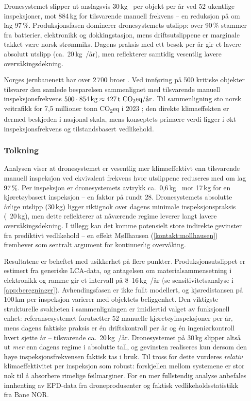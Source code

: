 Dronesystemet slipper ut anslagsvis 30\,kg~ per objekt per år ved 52 ukentlige inspeksjoner, mot 884\,kg for tilsvarende manuell frekvens -- en reduksjon på om lag 97\,\%. Produksjonsfasen dominerer dronesystemets utslipp: over 90\,\% stammer fra batterier, elektronikk og dokkingstasjon, mens driftsutslippene er marginale takket være norsk strømmiks. Dagens praksis med ett besøk per år gir et lavere absolutt utslipp (ca.\ 20\,kg~/år), men reflekterer samtidig vesentlig lavere overvåkingsdekning.

Norges jernbanenett har over 2\,700 broer \parencite{jernbanedirektoratet_tall}. Ved innføring på 500 kritiske objekter tilsvarer den samlede besparelsen sammenlignet med tilsvarende manuell inspeksjonsfrekvens $500 \cdot 854\,\text{kg} \approx 427\,\text{t~\ce{CO2eq}/år}$. Til sammenligning sto norsk veitrafikk for 7{,}5 millioner tonn CO\textsubscript{2}eq i 2023 \parencite{ssb_utslipp}; den direkte klimaeffekten er dermed beskjeden i nasjonal skala, mens konseptets primære verdi ligger i økt inspeksjonsfrekvens og tilstandsbasert vedlikehold.

\subsubsection{Tolkning}

Analysen viser at dronesystemet er vesentlig mer klimaeffektivt enn tilsvarende manuell inspeksjon ved ekvivalent frekvens hvor utslippene reduseres med om lag 97\,\%. Per inspeksjon er dronesystemets avtrykk ca.\ 0{,}6\,kg~ mot 17\,kg for en kjøretøybasert inspeksjon -- en faktor på rundt 28. Dronesystemets absolutte årlige utslipp (30\,kg) ligger riktignok over dagens minimale inspeksjonspraksis (~20\,kg), men dette reflekterer at nåværende regime leverer langt lavere overvåkingsdekning. I tillegg kan det komme potensielt store indirekte gevinster fra prediktivt vedlikehold -- en effekt Møllhausen (\cref{kontakt:mollhausen}) fremhever som sentralt argument for kontinuerlig overvåking.

Resultatene er beheftet med usikkerhet på flere punkter. Produksjonsutslippet er estimert fra generiske LCA-data, og antagelsen om materialsammensetning i elektronikk og ramme gir et intervall på 8--16\,kg~/år (se sensitivitetsanalyse i \cref{app:beregninger}). Avhendingsfasen er ikke fullt modellert, og kjøredistansen på 100\,km per inspeksjon varierer med objektets beliggenhet. Den viktigste strukturelle svakheten i sammenligningen er imidlertid valget av funksjonell enhet: referansesystemet forutsetter 52 manuelle kjøretøyinspeksjoner per år, mens dagens faktiske praksis er én driftskontroll per år og én ingeniørkontroll hvert sjette år -- tilsvarende ca.\ 20\,kg~/år. Dronesystemet på 30\,kg slipper altså ut \emph{mer} enn dagens regime i absolutte tall, og gevinsten realiseres kun dersom den høye inspeksjonsfrekvensen faktisk tas i bruk. Til tross for dette vurderes \emph{relativ} klimaeffektivitet per inspeksjon som robust: forskjellen mellom systemene er stor nok til å absorbere rimelige feilmarginer. For en mer fullstendig analyse anbefales innhenting av EPD-data fra droneprodusenter og faktisk vedlikeholdsstatistikk fra Bane NOR.
